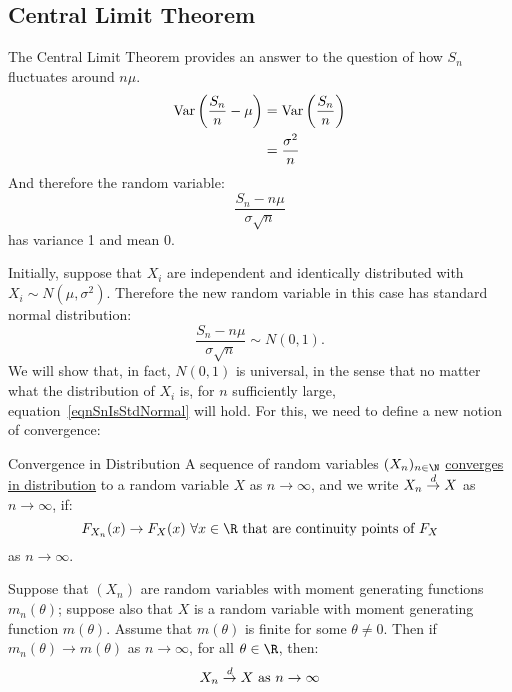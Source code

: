 \documentclass[../Main.tex]{subfiles}
\begin{document}
\subsection{Central Limit Theorem}
The Central Limit Theorem provides an answer to the question of how $S_n$ fluctuates around $n\mu$.
\begin{align*}
    \operatorname{Var}\left(\frac{S_n}{n} - \mu\right) &= \operatorname{Var}\left(\frac{S_n}{n}\right) \\
    &= \frac{\sigma^2}{n}
\end{align*}
And therefore the random variable:
\begin{equation*}
    \frac{S_n - n\mu}{\sigma\sqrt{n}}
\end{equation*}
has variance 1 and mean 0.

Initially, suppose that $X_i$ are independent and identically distributed with $X_i \sim N(\mu, \sigma^2)$.
Therefore the new random variable in this case has standard normal distribution:
\begin{equation}
    \frac{S_n - n\mu}{\sigma\sqrt{n}} \sim N(0, 1).
    \label{eqnSnIsStdNormal}
\end{equation}
We will show that, in fact, $N(0, 1)$ is universal, in the sense that no matter what the distribution of $X_i$ is, for $n$ sufficiently large, equation~\ref{eqnSnIsStdNormal} will hold.
For this, we need to define a new notion of convergence:
\begin{definition}{Convergence in Distribution}
    A sequence of random variables $(X_n)_{n \in \N}$ \underline{converges in distribution} to a random variable $X$ as $n \to \infty$, and we write $X_n \overset{d}{\rightarrow} X$ as $n \to \infty$, if:
    \begin{equation*}
        F_{X_n}(x) \to F_X(x)~\forall x \in \R \text{ that are continuity points of } F_X
    \end{equation*}
    as $n \to \infty$.
\end{definition}
\begin{theorem}
    Suppose that $(X_n)$ are random variables with moment generating functions $m_n(\theta)$; suppose also that $X$ is a random variable with moment generating function $m(\theta)$. Assume that $m(\theta)$ is finite for some $\theta \neq 0$. Then if $m_n(\theta) \to m(\theta)$ as $n \to \infty$, for all $\theta \in \R$, then:
    \begin{equation*}
        X_n \overset{d}{\rightarrow} X \text{ as } n \to \infty
    \end{equation*}
    \label{thmMGFContinuity}
\end{theorem}
\end{document}
